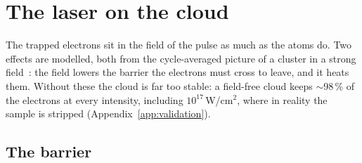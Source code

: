 \chapter{The laser on the cloud}
\label{ch:laser}


The trapped electrons sit in the field of the pulse as much as the atoms do.
Two effects are modelled, both from the cycle-averaged picture of a cluster in a strong
field~\cite{ditmire1996,saalmann2006,fennel2010}: the field lowers the barrier the electrons must cross to leave, and it
heats them.
Without these the cloud is far too stable: a field-free cloud keeps $\sim$98\,\% of the electrons at every intensity,
including $10^{17}$\,W/cm$^2$, where in reality the sample is stripped (Appendix~\ref{app:validation}).

\section{The barrier}
\label{sec:barrier}

